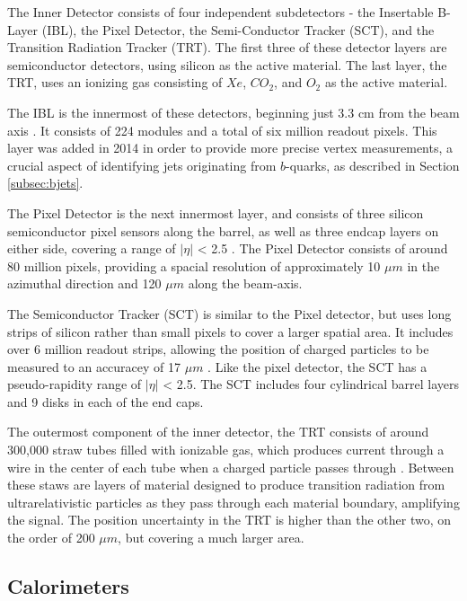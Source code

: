 The Inner Detector consists of four independent subdetectors - the Insertable B-Layer (IBL), the Pixel Detector, the Semi-Conductor Tracker (SCT), and the Transition Radiation Tracker (TRT). The first three of these detector layers are semiconductor detectors, using silicon as the active material. The last layer, the TRT, uses an ionizing gas consisting of $Xe$, $CO_2$, and $O_2$ as the active material.

The IBL is the innermost of these detectors, beginning just 3.3 cm from the beam axis \cite{larosa2016atlas}. It consists of 224 modules and a total of six million readout pixels. This layer was added in 2014 in order to provide more precise vertex measurements, a crucial aspect of identifying jets originating from $b$-quarks, as described in Section \ref{subsec:bjets}. 

The Pixel Detector is the next innermost layer, and consists of three silicon semiconductor pixel sensors along the barrel, as well as three endcap layers on either side, covering a range of $|\eta|$ < 2.5 \cite{PERF-2012-05}. The Pixel Detector consists of around 80 million pixels, providing a spacial resolution of approximately 10 $\mu m$ in the azimuthal direction and 120 $\mu m$ along the beam-axis. 

The Semiconductor Tracker (SCT) is similar to the Pixel detector, but uses long strips of silicon rather than small pixels to cover a larger spatial area. It includes over 6 million readout strips, allowing the position of charged particles to be measured to an accuracey of 17 $\mu m$ \cite{IDET-2013-01}. Like the pixel detector, the SCT has a pseudo-rapidity range of $|\eta|$ < 2.5. The SCT includes four cylindrical barrel layers and 9 disks in each of the end caps.

The outermost component of the inner detector, the TRT consists of around 300,000 straw tubes filled with ionizable gas, which produces current through a wire in the center of each tube when a charged particle passes through \cite{IDET-2015-01}. Between these staws are layers of material designed to produce transition radiation from ultrarelativistic particles as they pass through each material boundary, amplifying the signal. The position uncertainty in the TRT is higher than the other two, on the order of 200 $\mu m$, but covering a much larger area.

\subsection{Calorimeters}
\label{sec:calo}

